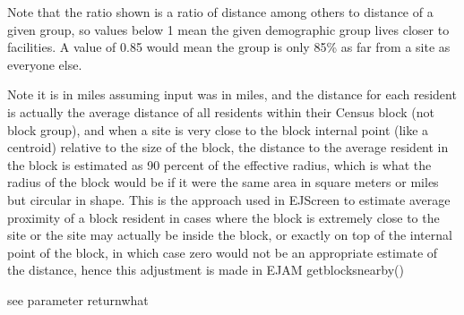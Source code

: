 \documentclass[a4paper]{book}
\begin{document}
%
\begin{Details}\relax
Note that the ratio shown is a ratio of distance among others to distance of a given group,
so values below 1 mean the given demographic group lives closer to facilities.
A value of 0.85 would mean the group is only 85\% as far from a site as everyone else.

Note it is in miles assuming input was in miles, and the distance for each resident is
actually the average distance of all residents within their Census block (not block group),
and when a site is very close to the block internal point (like a centroid)
relative to the size of the block, the distance to the average resident in the block is
estimated as 90 percent of the effective radius, which is what the radius of the block
would be if it were the same area in square meters or miles but circular in shape.
This is the approach used in EJScreen to estimate average proximity of a block resident in
cases where the block is extremely close to the site or the site may actually be inside the block,
or exactly on top of the internal point of the block, in which case zero would not be an
appropriate estimate of the distance, hence this adjustment is made in EJAM getblocksnearby()
\end{Details}
%
\begin{Value}
see parameter returnwhat
\end{Value}
%
\begin{SeeAlso}\relax
{}

  
\end{SeeAlso}
%
\begin{Examples}
\end{Examples}
\end{document}
